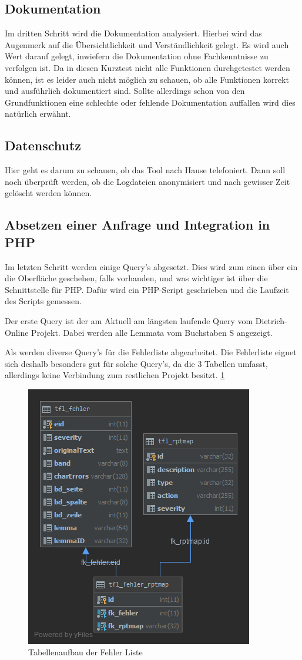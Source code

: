 \subsection{Dokumentation}

Im dritten Schritt wird die Dokumentation analysiert. Hierbei wird das Augenmerk auf die Übersichtlichkeit und Verständlichkeit gelegt. Es wird auch Wert darauf gelegt, inwiefern die Dokumentation ohne Fachkenntnisse zu verfolgen ist. Da in diesen Kurztest nicht alle Funktionen durchgetestet werden können, ist es leider auch nicht möglich zu schauen, ob alle Funktionen korrekt und ausführlich dokumentiert sind. Sollte allerdings schon von den Grundfunktionen eine schlechte oder fehlende Dokumentation auffallen wird dies natürlich erwähnt. 

\subsection{Datenschutz}

Hier geht es darum zu schauen, ob das Tool nach Hause telefoniert. Dann soll noch überprüft werden, ob die Logdateien anonymisiert und nach gewisser Zeit gelöscht werden können.

\subsection{Absetzen einer Anfrage und Integration in PHP}

Im letzten Schritt werden einige Query’s abgesetzt. Dies wird zum einen über ein die Oberfläche geschehen, falls vorhanden, und was wichtiger ist über die Schnittstelle für PHP. Dafür wird ein PHP-Script geschrieben und die Laufzeit des Scripts gemessen.

Der erste Query ist der am Aktuell am längsten laufende Query vom Dietrich-Online Projekt. Dabei werden alle Lemmata vom Buchstaben S angezeigt.


Als werden diverse Query’s für die Fehlerliste abgearbeitet. Die Fehlerliste eignet sich deshalb besonders gut für solche Query’s, da die 3 Tabellen umfasst, allerdings keine Verbindung zum restlichen Projekt besitzt. \ref{img:errorListStructure}

\begin{figure}
	\centering
	\includegraphics[width=0.5\linewidth]{images/structure_errormodule.png}
	\caption{Tabellenaufbau der Fehler Liste}
	\label{img:errorListStructure}
\end{figure}


